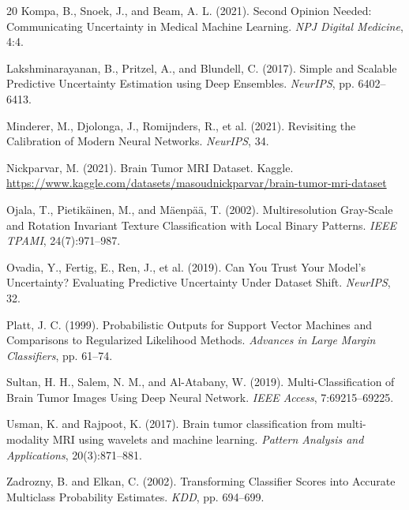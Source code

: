 \documentclass[12pt,a4paper]{article}
\begin{document}
\begin{thebibliography}{20}
Kompa, B., Snoek, J., and Beam, A. L. (2021).
\newblock Second Opinion Needed: Communicating Uncertainty in Medical Machine Learning.
\newblock \textit{NPJ Digital Medicine}, 4:4.

Lakshminarayanan, B., Pritzel, A., and Blundell, C. (2017).
\newblock Simple and Scalable Predictive Uncertainty Estimation using Deep Ensembles.
\newblock \textit{NeurIPS}, pp. 6402--6413.

Minderer, M., Djolonga, J., Romijnders, R., et al. (2021).
\newblock Revisiting the Calibration of Modern Neural Networks.
\newblock \textit{NeurIPS}, 34.

Nickparvar, M. (2021).
\newblock Brain Tumor MRI Dataset.
\newblock Kaggle. \url{https://www.kaggle.com/datasets/masoudnickparvar/brain-tumor-mri-dataset}

Ojala, T., Pietikäinen, M., and Mäenpää, T. (2002).
\newblock Multiresolution Gray-Scale and Rotation Invariant Texture Classification with Local Binary Patterns.
\newblock \textit{IEEE TPAMI}, 24(7):971--987.

Ovadia, Y., Fertig, E., Ren, J., et al. (2019).
\newblock Can You Trust Your Model's Uncertainty? Evaluating Predictive Uncertainty Under Dataset Shift.
\newblock \textit{NeurIPS}, 32.

Platt, J. C. (1999).
\newblock Probabilistic Outputs for Support Vector Machines and Comparisons to Regularized Likelihood Methods.
\newblock \textit{Advances in Large Margin Classifiers}, pp. 61--74.

Sultan, H. H., Salem, N. M., and Al-Atabany, W. (2019).
\newblock Multi-Classification of Brain Tumor Images Using Deep Neural Network.
\newblock \textit{IEEE Access}, 7:69215--69225.

Usman, K. and Rajpoot, K. (2017).
\newblock Brain tumor classification from multi-modality MRI using wavelets and machine learning.
\newblock \textit{Pattern Analysis and Applications}, 20(3):871--881.

Zadrozny, B. and Elkan, C. (2002).
\newblock Transforming Classifier Scores into Accurate Multiclass Probability Estimates.
\newblock \textit{KDD}, pp. 694--699.

\end{thebibliography}
\end{document}

